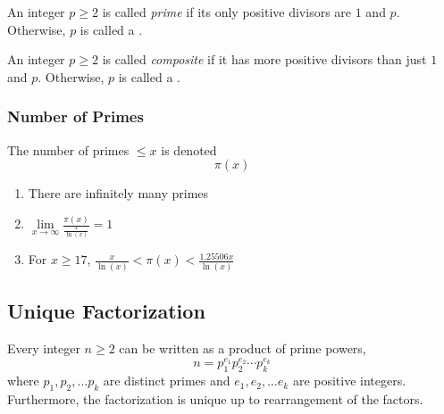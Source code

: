 \begin{definition}[Prime]\label{def:Prime}
  An integer $p \geq 2$ is called \emph{prime} if its only positive divisors are $1$ and $p$.
  Otherwise, $p$ is called a \emph{}.
\end{definition}

\begin{definition}[Composite]\label{def:Composite}
  An integer $p \geq 2$ is called \emph{composite} if it has more positive divisors than just $1$ and $p$.
  Otherwise, $p$ is called a \emph{}.
\end{definition}

\subsubsection{Number of Primes}\label{subsubsec:Number_of_Primes}
The number of primes $\leq x$ is denoted
\begin{equation}\label{eq:Number_of_Primes}
  \pi(x)
\end{equation}
\begin{enumerate}[noitemsep]
\item There are infinitely many primes
\item $\lim\limits_{x \rightarrow \infty} \frac{\pi(x)}{\frac{x}{\ln(x)}} = 1$
\item For $x \geq 17$, $\frac{x}{\ln(x)} < \pi(x) < \frac{1.25506x}{\ln(x)}$
\end{enumerate}

\subsection{Unique Factorization}\label{subsec:Unique_Factorization}
\begin{theorem}\label{thm:Unique_Factorization_Theorem}
  Every integer $n \geq 2$ can be written as a product of prime powers,
  \begin{equation*}
    n = p_{1}^{e_{1}} p_{2}^{e_{2}} \cdots p_{k}^{e_{k}}
  \end{equation*}
  where $p_{1}, p_{2}, \ldots p_{k}$ are distinct primes and $e_{1}, e_{2}, \ldots e_{k}$ are positive integers.
  Furthermore, the factorization is unique up to rearrangement of the factors.
\end{theorem}

